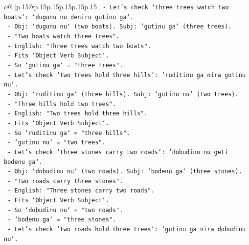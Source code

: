 \documentclass{article}
\begin{document}
{\begin{supertabular}{c@{$\;$}|p{.15\linewidth}@{}p{.15\linewidth}p{.15\linewidth}p{.15\linewidth}p{.15\linewidth}p{.15\linewidth}}
{{{\texttt{                           {-} Let's check `three trees watch two boats`: `dugunu nu deniru gutinu ga`.} \\
\texttt{                             {-} Obj: `dugunu nu` (two boats). Subj: `gutinu ga` (three trees).} \\
\texttt{                             {-} "Two boats watch three trees".} \\
\texttt{                             {-} English: "Three trees watch two boats".} \\
\texttt{                             {-} Fits `Object Verb Subject`.} \\
\texttt{                             {-} So `gutinu ga` = "three trees".} \\
\texttt{                           {-} Let's check `two trees hold three hills`: `ruditinu ga nira gutinu nu`.} \\
\texttt{                             {-} Obj: `ruditinu ga` (three hills). Subj: `gutinu nu` (two trees).} \\
\texttt{                             {-} "Three hills hold two trees".} \\
\texttt{                             {-} English: "Two trees hold three hills".} \\
\texttt{                             {-} Fits `Object Verb Subject`.} \\
\texttt{                             {-} So `ruditinu ga` = "three hills".} \\
\texttt{                             {-} `gutinu nu` = "two trees".} \\
\texttt{                           {-} Let's check `three stones carry two roads`: `dobudinu nu geti bodenu ga`.} \\
\texttt{                             {-} Obj: `dobudinu nu` (two roads). Subj: `bodenu ga` (three stones).} \\
\texttt{                             {-} "Two roads carry three stones".} \\
\texttt{                             {-} English: "Three stones carry two roads".} \\
\texttt{                             {-} Fits `Object Verb Subject`.} \\
\texttt{                             {-} So `dobudinu nu` = "two roads".} \\
\texttt{                             {-} `bodenu ga` = "three stones".} \\
\texttt{                           {-} Let's check `two roads hold three trees`: `gutinu ga nira dobudinu nu`.} \\
}}}
\end{supertabular}}
\end{document}
